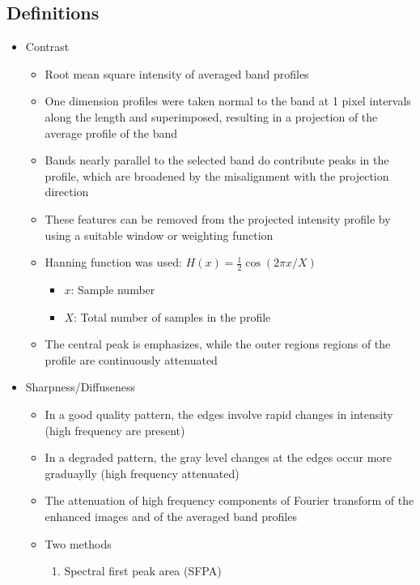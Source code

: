 \documentclass[letterpaper]{article}
\begin{document}
		\subsection{Definitions}
			\begin{itemize}
				\item Contrast \cite{Wilkinson1991}
					\begin{itemize}
						\item Root mean square intensity of averaged band profiles
						\item One dimension profiles were taken normal to the band at 1 pixel intervals along the length and superimposed, resulting in a projection of the average profile of the band
						\item Bands nearly parallel to the selected band do contribute peaks in the profile, which are broadened by the misalignment with the projection direction
						\item These features can be removed from the projected intensity profile by using a suitable window or weighting function
						\item Hanning function was used: $H(x) = \frac{1}{2}\cos{\left(2\pi x / X\right)}$
							\begin{itemize}
								\item $x$: Sample number
								\item $X$: Total number of samples in the profile
							\end{itemize}
						\item The central peak is emphasizes, while the outer regions regions of the profile are continuously attenuated
					\end{itemize}
				\item Sharpness/Diffuseness \cite{Wilkinson1991}
					\begin{itemize}
						\item In a good quality pattern, the edges involve rapid changes in intensity (high frequency are present)
						\item In a degraded pattern, the gray level changes at the edges occur more graduaylly (high frequency attenuated)
						\item The attenuation of high frequency components of Fourier transform of the enhanced images and of the averaged band profiles
						\item Two methods
							\begin{enumerate}
								\item Spectral first peak area (SFPA)
									\begin{itemize}

\end{itemize}
\end{enumerate}
\end{itemize}
\end{itemize}
\end{document}
